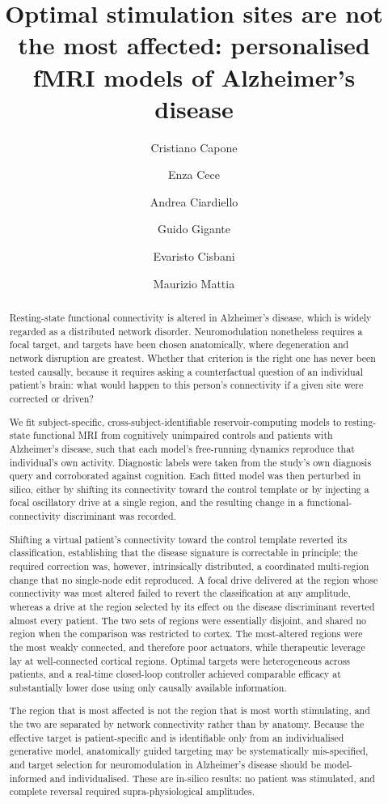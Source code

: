 \documentclass[11pt]{article}
\title{\bfseries Optimal stimulation sites are not the most affected:
personalised fMRI models of Alzheimer's disease}
\author[1,*]{Cristiano Capone}
\author[2]{Enza Cece}
\author[1]{Andrea Ciardiello}
\author[1]{Guido Gigante}
\author[2]{Evaristo Cisbani}
\author[3]{Maurizio Mattia}
\affil[1]{Dipartimento di Ambiente e Salute,
Istituto Superiore di Sanit\`a, 00161 Rome, Italy}
\affil[2]{Intelligenza Artificiale e Tecnologie Innovative per la Salute,
Istituto Superiore di Sanit\`a, 00161 Rome, Italy}
\affil[3]{Dipartimento di Neuroscienze, Istituto Superiore di Sanit\`a,
00161 Rome, Italy}
\affil[*]{Corresponding author: \href{mailto:cristiano0capone@gmail.com}%
{cristiano0capone@gmail.com}}
\date{}
\begin{document}
\linenumbers
\maketitle

\begin{abstract}
\noindent
Resting-state functional connectivity is altered in Alzheimer's disease, which is
widely regarded as a distributed network disorder. Neuromodulation nonetheless
requires a focal target, and targets have been chosen anatomically, where
degeneration and network disruption are greatest. Whether that criterion is the
right one has never been tested causally, because it requires asking a
counterfactual question of an individual patient's brain: what would happen to
this person's connectivity if a given site were corrected or driven?

We fit subject-specific, cross-subject-identifiable reservoir-computing models to
resting-state functional MRI from cognitively unimpaired controls and patients
with Alzheimer's disease, such that each model's free-running dynamics reproduce
that individual's own activity. Diagnostic labels were taken from the study's own
diagnosis query and corroborated against cognition. Each fitted model was then
perturbed in silico, either by shifting its connectivity toward the control
template or by injecting a focal oscillatory drive at a single region, and the
resulting change in a functional-connectivity discriminant was recorded.

Shifting a virtual patient's connectivity toward the control template reverted its
classification, establishing that the disease signature is correctable in
principle; the required correction was, however, intrinsically distributed, a
coordinated multi-region change that no single-node edit reproduced. A focal drive
delivered at the region whose connectivity was most altered failed to revert the
classification at any amplitude, whereas a drive at the region selected by its
effect on the disease discriminant reverted almost every patient. The two sets of
regions were essentially disjoint, and shared no region when the comparison was
restricted to cortex. The most-altered regions were the most weakly connected, and
therefore poor actuators, while therapeutic leverage lay at well-connected
cortical regions. Optimal targets were heterogeneous across patients, and a
real-time closed-loop controller achieved comparable efficacy at substantially
lower dose using only causally available information.

The region that is most affected is not the region that is most worth
stimulating, and the two are separated by network connectivity rather than by
anatomy. Because the effective target is patient-specific and is identifiable only
from an individualised generative model, anatomically guided targeting may be
systematically mis-specified, and target selection for neuromodulation in
Alzheimer's disease should be model-informed and individualised. These are
in-silico results: no patient was stimulated, and complete reversal required
supra-physiological amplitudes.
\end{abstract}
\end{document}
